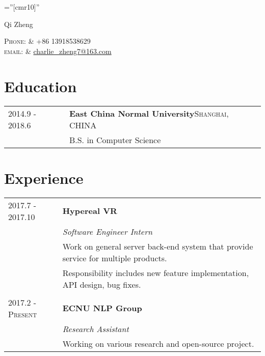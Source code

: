 \documentclass[a4paper,10pt]{article}
\begin{document}

\pagestyle{empty} %

\font\fb=''[cmr10]'' %

\par{\centering
		{\Large Qi Zheng \textsc{}
	}\par}
\centering\textsc{Phone:}     & +86 13918538629\\
\centering\textsc{email:}     & \href{mailto:charlie\_zheng7@163.com}{charlie\_zheng7@163.com}


\section{Education}
\begin{tabular}{l|p{13.3cm}}	
 2014.9 - 2018.6 & \textbf{East China Normal University}\qquad \qquad \qquad \qquad \qquad \qquad \textsc{Shanghai, CHINA}\\

& B.S. in Computer Science\\

\end{tabular}

\section{Experience}
\begin{tabular}{l|p{15cm}}
 \textsc{2017.7 - 2017.10} & \textbf{Hypereal VR}\\&\emph{Software Engineer Intern}\\&\footnotesize{Work on general server back-end system that provide service for multiple products.} \\&\footnotesize{Responsibility includes new feature implementation, API design, bug fixes.}\\\multicolumn{2}{c}{} \\
\textsc{2017.2 - Present} & \textbf{ECNU NLP Group}\\&\emph{Research Assistant}\\&\footnotesize{Working on various research and open-source project.}
\end{tabular}
\end{document}
